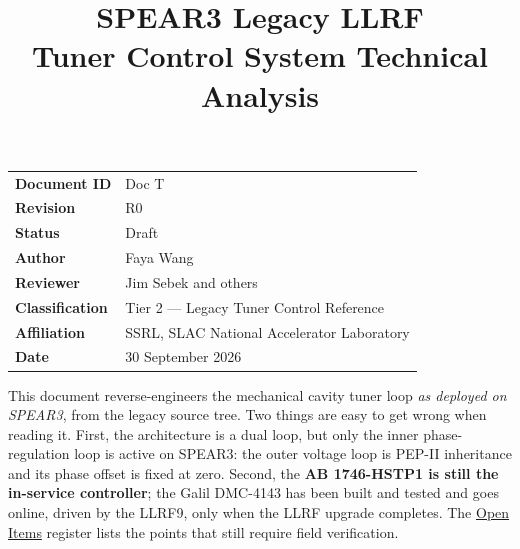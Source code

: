 \documentclass[letterpaper,11pt]{article}
\title{\vspace{-1.4cm}\bfseries SPEAR3 Legacy LLRF\\[2mm]
       \Large Tuner Control System Technical Analysis}
\author{}
\date{}
\numberwithin{equation}{section}
\begin{document}
\maketitle
\thispagestyle{plain}

\begin{center}
\begin{minipage}{0.86\linewidth}\small
\begin{tabular}{@{}ll@{}}
\textbf{Document ID} & Doc T \\
\textbf{Revision}    & R0 \\
\textbf{Status}      & Draft \\
\textbf{Author}      & Faya Wang \\
\textbf{Reviewer}    & Jim Sebek and others \\
\textbf{Classification} & Tier 2 --- Legacy Tuner Control Reference \\
\textbf{Affiliation} & SSRL, SLAC National Accelerator Laboratory \\
\textbf{Date}        & 30 September 2026 \\
\end{tabular}
\end{minipage}
\end{center}

\vspace{4mm}
\begin{keynote}
This document reverse-engineers the mechanical cavity tuner loop \emph{as
deployed on SPEAR3}, from the legacy  source
tree. Two things are easy to get wrong when reading it. First, the architecture
is a dual loop, but only the inner phase-regulation loop is active on SPEAR3:
the outer voltage loop is PEP-II inheritance and its phase offset is fixed at
zero. Second, the \textbf{AB 1746-HSTP1 is still the in-service controller};
the Galil DMC-4143 has been built and tested and goes online, driven by the
LLRF9, only when the LLRF upgrade completes. The \hyperref[sec:open-items]{Open Items} register lists the points
that still require field verification.
\end{keynote}

\clearpage
\tableofcontents
\clearpage
\listoffigures
\clearpage


\end{document}
